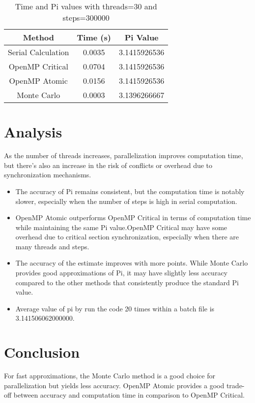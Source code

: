 \documentclass[11pt, twocolumn]{article}
\begin{document}
\begin{table}[H]
    \centering
    \begin{tabular}{|c|c|c|}
    \hline
    Method & Time (s) & Pi Value \\
    \hline
    Serial Calculation & 0.0035 & 3.1415926536 \\
    OpenMP Critical & 0.0704 & 3.1415926536 \\
    OpenMP Atomic & 0.0156 & 3.1415926536 \\
    Monte Carlo & 0.0003 & 3.1396266667 \\
    \hline
    \end{tabular}
    \caption{Time and Pi values with threads=30 and steps=300000}
\end{table}

\section{Analysis}
As the number of threads increases, parallelization improves computation time, but there's also an increase in the risk of conflicts or overhead due to synchronization mechanisms.

\begin{itemize}
    \item The accuracy of Pi remains consistent, but the computation time is notably slower, especially when the number of steps is high in serial computation.
\end{itemize}
\begin{itemize}
    \item OpenMP Atomic outperforms OpenMP Critical in terms of computation time while maintaining the same Pi value.OpenMP Critical may have some overhead due to critical section synchronization, especially when there are many threads and steps.
\end{itemize}
\begin{itemize}
    \item The accuracy of the estimate improves with more points. While Monte Carlo provides good approximations of Pi, it may have slightly less accuracy compared to the other methods that consistently produce the standard Pi value.
\end{itemize}
\begin{itemize}
    \item Average value of pi by run the code 20 times within a batch file is 3.141506062000000.
\end{itemize}

\section{Conclusion}
For fast approximations, the Monte Carlo method is a good choice for parallelization but yields less accuracy. OpenMP Atomic provides a good trade-off between accuracy and computation time in comparison to OpenMP Critical.
\end{document}
